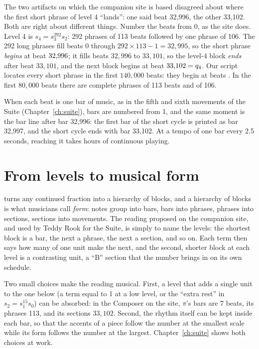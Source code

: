 The two artifacts on which the companion site is based disagreed about where the first short phrase of level 4 ``lands'': one said beat 32{,}996, the other 33{,}102. Both are right about different things. Number the beats from 0, as the site does. Level 4 is $s_4 = s_3^{292} s_2$: 292 phrases of 113 beats followed by one phrase of 106. The 292 long phrases fill beats 0 through $292 \times 113 - 1 = 32{,}995$, so the short phrase \emph{begins} at beat $32{,}996$; it fills beats $32{,}996$ to $33{,}101$, so the level-4 block \emph{ends} after beat $33{,}101$, and the next block begins at beat $33{,}102 = q_4$. Our script locates every short phrase in the first $140{,}000$ beats: they begin at beats \ShortStarts. In the first $80{,}000$ beats there are \PhrasesLong{} complete phrases of 113 beats and \PhrasesShort{} of 106.

When each beat is one bar of music, as in the fifth and sixth movements of the Suite (Chapter~\ref{ch:suite}), bars are numbered from 1, and the same moment is the bar line after bar 32{,}996: the first bar of the short cycle is printed as bar 32{,}997, and the short cycle ends with bar 33{,}102. At a tempo of one bar every 2.5 seconds, reaching it takes \HoursToRare{} hours of continuous playing.

\section{From levels to musical form}\label{sec:form}

 turns any continued fraction into a hierarchy of blocks, and a hierarchy of blocks is what musicians call \emph{form}: notes group into bars, bars into phrases, phrases into sections, sections into movements. The reading proposed on the companion site, and used by Teddy Rook for the Suite, is simply to name the levels: the shortest block is a bar, the next a phrase, the next a section, and so on. Each term then says how many of one unit make the next, and the second, shorter block at each level is a contrasting unit, a ``B'' section that the number brings in on its own schedule.

Two small choices make the reading musical. First, a level that adds a single unit to the one below (a term equal to 1 at a low level, or the ``extra rest'' in $s_2 = s_1^{15} s_0$) can be absorbed: in the Composer on the site, $\pi$'s bars are 7 beats, its phrases 113, and its sections $33{,}102$. Second, the rhythm itself can be kept inside each bar, so that the accents of a piece follow the number at the smallest scale while its form follows the number at the largest. Chapter~\ref{ch:suite} shows both choices at work.

